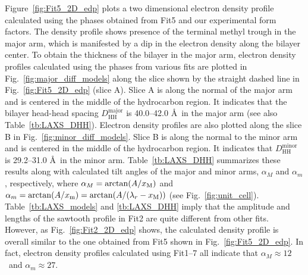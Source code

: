 Figure~\ref{fig:Fit5_2D_edp} plots a two dimensional electron density profile calculated
using the phases obtained from Fit5 and our experimental form factors.
The density profile shows presence of the terminal methyl trough in the major arm, 
which is manifested by a dip in the electron density along the bilayer center. 
To obtain the thickness of the bilayer in the major arm, 
electron density profiles calculated
using the phases from various fits are 
plotted in Fig.~\ref{fig:major_diff_models} 
along the slice shown by the straight dashed line in Fig.~\ref{fig:Fit5_2D_edp}
(slice A).
Slice A is along the normal of the major arm and is centered in the middle of 
the hydrocarbon region. It indicates that the bilayer head-head spacing 
$D_\text{HH}^\text{major}$ is 40.0--42.0 \AA\ in the major arm
(see also Table~\ref{tb:LAXS_DHH}). 
Electron density profiles are also plotted along the slice B
in Fig.~\ref{fig:minor_diff_models}.
Slice B is
along the normal to the minor arm and is centered in the middle of the
hydrocarbon region. It indicates that $D_\text{HH}^\text{minor}$ is
29.2--31.0 \AA\ in the minor arm.
Table~\ref{tb:LAXS_DHH} summarizes these results along with calculated
tilt angles of the major and minor arms, $\alpha_M$ and $\alpha_m$, respectively,
where $\alpha_M=\arctan(A/x_\textrm{M})$ and $\alpha_m=\arctan(A/x_\textrm{m})=\arctan(A/(\lambda_r-x_\textrm{M}))$
(see Fig.~\ref{fig:unit_cell}). Table~\ref{tb:LAXS_models} and \ref{tb:LAXS_DHH}
imply that the amplitude and lengths of the sawtooth profile in Fit2 are 
quite different from other fits. However, as Fig.~\ref{fig:Fit2_2D_edp} shows,
the calculated density profile is overall similar to the one obtained from Fit5
shown in Fig.~\ref{fig:Fit5_2D_edp}. In fact, electron density profiles calculated
using Fit1--7 all indicate that $\alpha_M \approx 12$\textdegree\ and
$\alpha_m \approx 27$\textdegree. 

